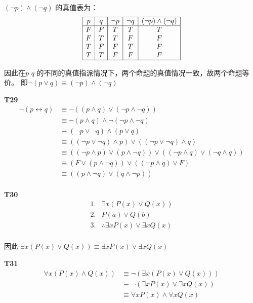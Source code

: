 \documentclass[12pt, a4paper]{ctexart}
\begin{document}
$(\lnot p) \land (\lnot q)$ 的真值表为：
\[
\begin{array}{|c|c|c|c|c|}
    \hline
    p & q & \lnot p & \lnot q & (\lnot p) \land (\lnot q)\\
    \hline
    F & F & T & T & T\\
    F & T & T & F & F\\
    T & F & F & T & F\\
    T & T & F & F & F\\
    \hline
\end{array}
\]

因此在$\textit{p q}$ 的不同的真值指派情况下，两个命题的真值情况一致，故两个命题等价。
即$\lnot (p \lor q) \equiv (\lnot p) \land (\lnot q)$

\textbf{T29}
\begin{align*}
    \lnot (p \leftrightarrow q) &\equiv \lnot ((p \land q) \lor (\lnot p \land \lnot q))\\
    &\equiv \lnot (p \land q) \land \lnot (\lnot p \land \lnot q)\\
    &\equiv (\lnot p \lor \lnot q) \land (p \lor q)\\
    &\equiv ((\lnot p \lor \lnot q) \land p) \lor ((\lnot p \lor \lnot q) \land q)\\
    &\equiv ((\lnot p \land p) \lor (p \land \lnot q)) \lor ((\lnot p \land q) \lor (\lnot q \land q))\\
    &\equiv (F \lor (p \land \lnot q)) \lor ((\lnot p \land q) \lor F)\\
    &\equiv ((p \land \lnot q) \lor (q \land \lnot p))\\
\end{align*}

\textbf{T30}
\[
\begin{array}{cc}
    1. & \exists x (P(x) \lor Q(x))\\
    2. & P(a) \lor Q(b)\\
    \hline
    3. & \therefore \exists x P(x) \lor \exists x Q(x)\\
\end{array}
\]

因此 $\exists x (P(x) \lor Q(x)) \equiv \exists x P(x) \lor \exists x Q(x)$

\textbf{T31}
\begin{align*}
\forall x (P(x) \land Q(x)) &\equiv \lnot (\exists x (P(x) \lor Q(x)))\\
&\equiv \lnot (\exists x P(x) \lor \exists x Q(x))\\
&\equiv \forall x P(x) \land \forall x Q(x)\\    
\end{align*}
\end{document}
